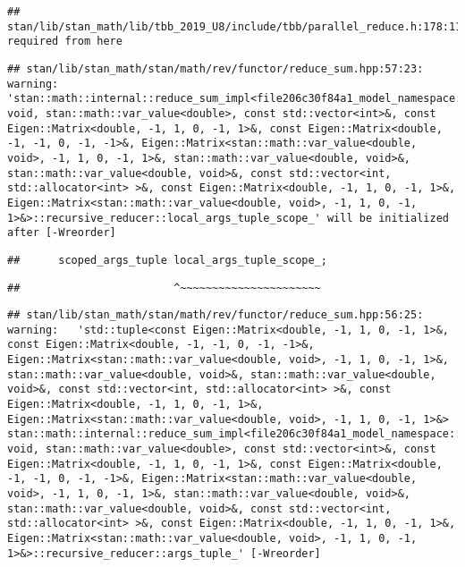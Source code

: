 \documentclass[
]{article}
\begin{document}
\begin{verbatim}
## stan/lib/stan_math/lib/tbb_2019_U8/include/tbb/parallel_reduce.h:178:11:   required from here
\end{verbatim}

\begin{verbatim}
## stan/lib/stan_math/stan/math/rev/functor/reduce_sum.hpp:57:23: warning: 'stan::math::internal::reduce_sum_impl<file206c30f84a1_model_namespace::partial_log_lik_rsfunctor__, void, stan::math::var_value<double>, const std::vector<int>&, const Eigen::Matrix<double, -1, 1, 0, -1, 1>&, const Eigen::Matrix<double, -1, -1, 0, -1, -1>&, Eigen::Matrix<stan::math::var_value<double, void>, -1, 1, 0, -1, 1>&, stan::math::var_value<double, void>&, stan::math::var_value<double, void>&, const std::vector<int, std::allocator<int> >&, const Eigen::Matrix<double, -1, 1, 0, -1, 1>&, Eigen::Matrix<stan::math::var_value<double, void>, -1, 1, 0, -1, 1>&>::recursive_reducer::local_args_tuple_scope_' will be initialized after [-Wreorder]
\end{verbatim}

\begin{verbatim}
##      scoped_args_tuple local_args_tuple_scope_;
\end{verbatim}

\begin{verbatim}
##                        ^~~~~~~~~~~~~~~~~~~~~~~
\end{verbatim}

\begin{verbatim}
## stan/lib/stan_math/stan/math/rev/functor/reduce_sum.hpp:56:25: warning:   'std::tuple<const Eigen::Matrix<double, -1, 1, 0, -1, 1>&, const Eigen::Matrix<double, -1, -1, 0, -1, -1>&, Eigen::Matrix<stan::math::var_value<double, void>, -1, 1, 0, -1, 1>&, stan::math::var_value<double, void>&, stan::math::var_value<double, void>&, const std::vector<int, std::allocator<int> >&, const Eigen::Matrix<double, -1, 1, 0, -1, 1>&, Eigen::Matrix<stan::math::var_value<double, void>, -1, 1, 0, -1, 1>&> stan::math::internal::reduce_sum_impl<file206c30f84a1_model_namespace::partial_log_lik_rsfunctor__, void, stan::math::var_value<double>, const std::vector<int>&, const Eigen::Matrix<double, -1, 1, 0, -1, 1>&, const Eigen::Matrix<double, -1, -1, 0, -1, -1>&, Eigen::Matrix<stan::math::var_value<double, void>, -1, 1, 0, -1, 1>&, stan::math::var_value<double, void>&, stan::math::var_value<double, void>&, const std::vector<int, std::allocator<int> >&, const Eigen::Matrix<double, -1, 1, 0, -1, 1>&, Eigen::Matrix<stan::math::var_value<double, void>, -1, 1, 0, -1, 1>&>::recursive_reducer::args_tuple_' [-Wreorder]
\end{verbatim}
\end{document}
